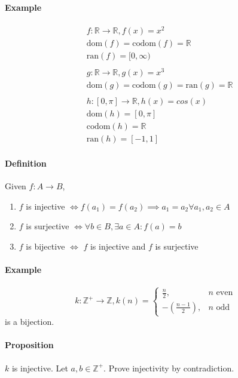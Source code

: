 \documentclass{article}
\newcommand{\mapab}[2]{{#1}\xrightarrow{}{#2}}
\newcommand{\mapaB}[2]{{#1}\xrightarrow{}\mathbb{#2}}
\newcommand{\mapAB}[2]{\mathbb{#1}\xrightarrow{}\mathbb{#2}}
\newcommand{\symintcc}[1]{[-#1,#1]}
\begin{document}
	\paragraph{Example}
	\begin{align*}
	&f: \mapAB{R}{R}, f(x) = x^2\\
	&\textrm{dom}(f) = \textrm{codom}(f) = \mathbb{R}\\
	&\textrm{ran}(f) = [0,\infty)\\~\\
	&g: \mapAB{R}{R}, g(x) = x^3\\
	&\textrm{dom}(g) = \textrm{codom}(g) = \textrm{ran}(g) = \mathbb{R}\\~\\
	&h: \mapaB{[0,\pi]}{R}, h(x) = cos(x)\\
	&\textrm{dom}(h) = [0,\pi]\\
	&\textrm{codom}(h) = \mathbb{R}\\
	&\textrm{ran}(h) = \symintcc{1}
	\end{align*}
	\paragraph{Definition}
	Given $f: \mapab{A}{B}$,
	\begin{enumerate}[label=(\roman*)]
		\item $f$ is injective $\iff f(a_1)=f(a_2)\implies a_1=a_2 \forall a_1,a_2\in A$
		\item $f$ is surjective $\iff \forall b\in B, \exists a\in A : f(a) = b$
		\item $f$ is bijective $\iff$ $f$ is injective and $f$ is surjective
	\end{enumerate}
	\paragraph{Example}
	\begin{equation*}
	k:\mapAB{Z^+}{Z}, k(n) = \begin{cases}
	\frac{n}{2}, & n\textrm{ even}\\
	-\left(\frac{n-1}{2}\right), & n\textrm{ odd}
	\end{cases}
	\end{equation*}
	is a bijection.
	\paragraph{Proposition} $k$ is injective.\newline
	Let $a, b \in \mathbb{Z}^+$. Prove injectivity by contradiction.
\end{document}
